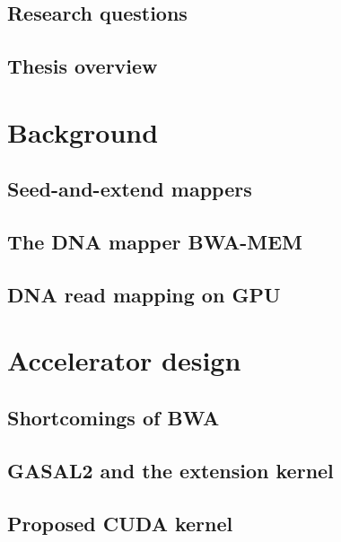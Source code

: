 \documentclass[11pt,twoside]{ce}
\begin{document}
\section{Research questions}


\section{Thesis overview}


\chapter{Background}
\label{chap:background}
\section{Seed-and-extend mappers}


\section{The DNA mapper BWA-MEM}


\section{DNA read mapping on GPU}


%


\chapter{Accelerator design}
\label{chap:accel}


\section{Shortcomings of BWA}

\section{GASAL2 and the extension kernel}
	

\section{Proposed CUDA kernel}

\end{document}
